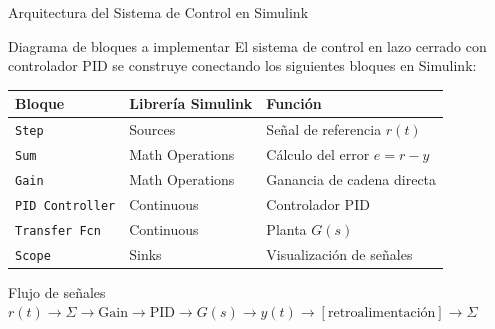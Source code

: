 \documentclass[aspectratio=169,xcolor=dvipsnames]{beamer}
\begin{document}
\begin{frame}{Arquitectura del Sistema de Control en Simulink}
    \begin{block}{Diagrama de bloques a implementar}
        El sistema de control en lazo cerrado con controlador PID se construye conectando los siguientes bloques en Simulink:
    \end{block}
    \vspace{0.5em}
    \begin{center}
    \begin{tabular}{lll}
        \toprule
        \textbf{Bloque} & \textbf{Librería Simulink} & \textbf{Función} \\
        \midrule
        \texttt{Step} & Sources & Señal de referencia $r(t)$ \\
        \texttt{Sum} & Math Operations & Cálculo del error $e = r - y$ \\
        \texttt{Gain} & Math Operations & Ganancia de cadena directa \\
        \texttt{PID Controller} & Continuous & Controlador PID \\
        \texttt{Transfer Fcn} & Continuous & Planta $G(s)$ \\
        \texttt{Scope} & Sinks & Visualización de señales \\
        \bottomrule
    \end{tabular}
    \end{center}
    \vspace{0.3em}
    \begin{exampleblock}{Flujo de señales}
        $r(t) \rightarrow \Sigma \rightarrow \text{Gain} \rightarrow \text{PID} \rightarrow G(s) \rightarrow y(t) \rightarrow [\text{retroalimentación}] \rightarrow \Sigma$
    \end{exampleblock}
\end{frame}
\end{document}
